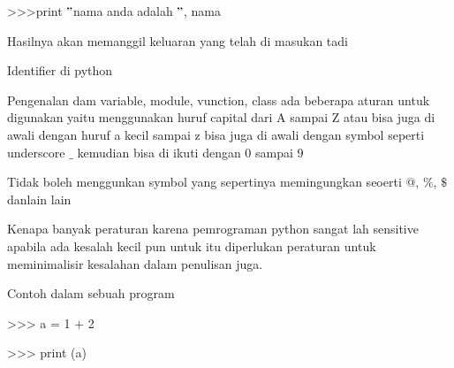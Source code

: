 \documentclass[a4paper,12pt]{report}
\begin{document}
\vspace{14pt}
\noindent 
{\fontsize{14pt}{14pt}\selectfont >>>print  $ " $nama anda adalah $ " $, nama \\} \par
\vspace{14pt}
\noindent 
{\fontsize{14pt}{14pt}\selectfont Hasilnya akan memanggil keluaran yang telah di masukan tadi \\} \par
\vspace{14pt}
\noindent 
{\fontsize{14pt}{14pt}\selectfont Identifier di python  \\} \par
\vspace{14pt}
\noindent 
{\fontsize{14pt}{14pt}\selectfont Pengenalan dam variable, module, vunction, class ada beberapa aturan untuk digunakan yaitu menggunakan huruf capital dari A sampai Z atau bisa juga di awali dengan huruf a kecil sampai z bisa juga di awali dengan symbol seperti underscore  $  \_  $ kemudian bisa di ikuti dengan 0 sampai 9 \\} \par
\vspace{14pt}
\noindent 
{\fontsize{14pt}{14pt}\selectfont Tidak boleh menggunkan symbol yang sepertinya memingungkan seoerti @, $  \%  $, $  \$  $ danlain lain \\} \par
\vspace{14pt}
\noindent 
{\fontsize{14pt}{14pt}\selectfont Kenapa banyak peraturan karena pemrograman python sangat lah sensitive apabila ada kesalah kecil pun untuk itu diperlukan peraturan untuk meminimalisir kesalahan dalam penulisan juga. \\} \par
\vspace{14pt}
\noindent 
{\fontsize{14pt}{14pt}\selectfont Contoh dalam sebuah program \\} \par
\vspace{14pt}
\noindent 
{\fontsize{14pt}{14pt}\selectfont >>> a = 1 + 2 \\} \par
\vspace{14pt}
\noindent 
{\fontsize{14pt}{14pt}\selectfont >>> print (a)  \\} \par
\vspace{14pt}
\noindent 
{\fontsize{14pt}{14pt} \\} \par
\end{document}
